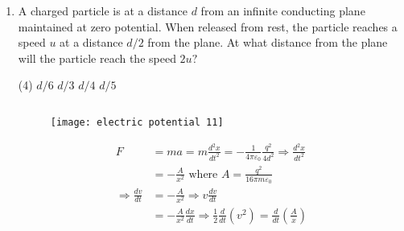 \begin{enumerate}
\begin{tasks}
	\end{tasks}
	\begin{answer}$\left. \right. $
		\begin{figure}[H]
			\centering
			\texttt{[image: electric potential 10]}
		\end{figure}
		\begin{align*}
		E_{+}&=\frac{1}{4 \pi \varepsilon_{0}} \frac{e}{(3 d / 2)^{2}}=\frac{1}{4 \pi \varepsilon_{0}} \frac{4 e}{9 d^{2}}\text{ and }E_{-}\\&=\frac{1}{4 \pi \varepsilon_{0}} \frac{e}{(d / 2)^{2}}=\frac{1}{4 \pi \varepsilon_{0}} \frac{4 e}{d^{2}}
		\intertext{Thus resultant electric field at point $P$ is}
		E&=E_{+}+E_{-}=\frac{1}{4 \pi \varepsilon_{0}} \frac{4 e}{9 d^{2}}+\frac{1}{4 \pi \varepsilon_{0}} \frac{4 e}{d^{2}}\\&=\frac{1}{4 \pi \varepsilon_{0}} \frac{40 e}{9 d^{2}}=\frac{1}{9 \pi \varepsilon_{0}} \frac{10 e}{d^{2}} \Rightarrow \vec{E}=\frac{1}{9 \pi \varepsilon_{0}} \frac{10 e}{d^{2}} \hat{x}
		\end{align*}
		So the correct answer is \textbf{Option (B)}
	\end{answer}
	\item A charged particle is at a distance $d$ from an infinite conducting plane maintained at zero potential. When released from rest, the particle reaches a speed $u$ at a distance $d / 2$ from the plane. At what distance from the plane will the particle reach the speed $2 u ?$
	{}
	\begin{tasks}(4)
		\task[\textbf{A.}] $d / 6$
		\task[\textbf{B.}] $d / 3$
		\task[\textbf{C.}] $d / 4$
		\task[\textbf{D.}] $d / 5$
	\end{tasks}
	\begin{answer}$\left. \right. $
		\begin{figure}[H]
			\centering
			\texttt{[image: electric potential 11]}
		\end{figure}
		\begin{align*}
		F&=m a=m \frac{d^{2} x}{d t^{2}}=-\frac{1}{4 \pi \varepsilon_{0}} \frac{q^{2}}{4 d^{2}} \Rightarrow \frac{d^{2} x}{d t^{2}}\\&=-\frac{A}{x^{2}}\text{ where }A=\frac{q^{2}}{16 \pi m \varepsilon_{0}}\\
		\Rightarrow \frac{d v}{d t}&=-\frac{A}{x^{2}} \Rightarrow v \frac{d v}{d t}\\&=-\frac{A}{x^{2}} \frac{d x}{d t} \Rightarrow \frac{1}{2} \frac{d}{d t}\left(v^{2}\right)=\frac{d}{d t}\left(\frac{A}{x}\right)\\

\end{align*}
\end{answer}
\end{enumerate}
